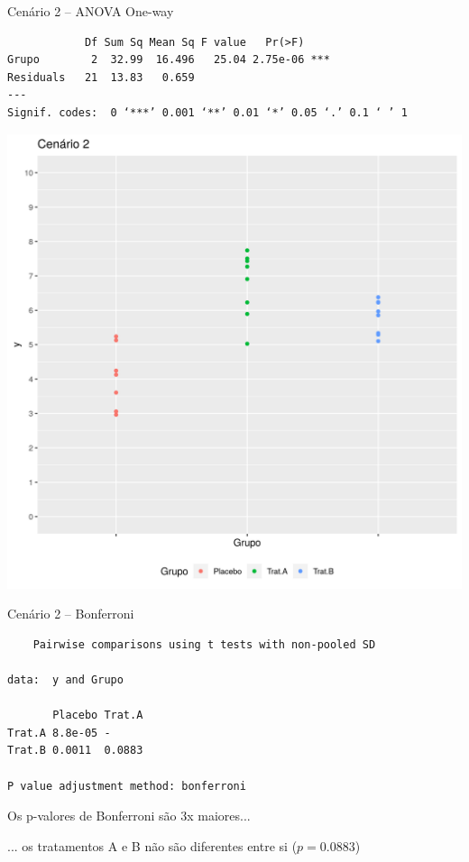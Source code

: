 \documentclass{beamer}
\begin{document}
\begin{frame}[fragile, label=cenario2-1way]{\scriptsize }
  \begin{exampleblock}{Cenário 2 -- ANOVA One-way}
    \tiny
\begin{verbatim}
            Df Sum Sq Mean Sq F value   Pr(>F)
Grupo        2  32.99  16.496   25.04 2.75e-06 ***
Residuals   21  13.83   0.659
---
Signif. codes:  0 ‘***’ 0.001 ‘**’ 0.01 ‘*’ 0.05 ‘.’ 0.1 ‘ ’ 1
\end{verbatim}
    \begin{center}
      \includegraphics[height=.5\textheight]{Cap13-30/cenario21}
    \end{center}
  \end{exampleblock}
\end{frame}


\begin{frame}[fragile]{\scriptsize }
  \begin{exampleblock}{Cenário 2 -- Bonferroni}
    \scriptsize
\begin{verbatim}
	Pairwise comparisons using t tests with non-pooled SD 

data:  y and Grupo 

       Placebo Trat.A
Trat.A 8.8e-05 -     
Trat.B 0.0011  0.0883

P value adjustment method: bonferroni
\end{verbatim}
  \end{exampleblock}
  \begin{block}{}
    \small
    Os p-valores de Bonferroni são 3x maiores...

    \bigskip
    ... os tratamentos A e B não são diferentes entre si ($p=0.0883$)
  \end{block}
\end{frame}
\end{document}
